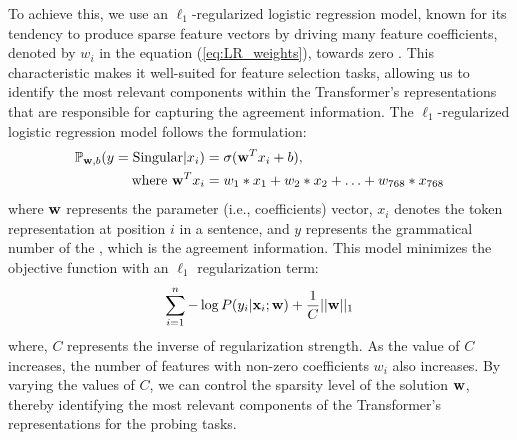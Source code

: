 To achieve this, we use an $\ell_1$-regularized logistic regression model,
known for its tendency to produce sparse feature vectors by driving many feature coefficients, denoted by $w_i$ in the equation (\ref{eq:LR_weights}), towards zero \citep{tibshirani96regression,ng2004feature}. This characteristic makes it well-suited for feature selection tasks, allowing us to identify the most relevant components within the Transformer's representations that are responsible for capturing the agreement information.
The $\ell_1$-regularized logistic regression model follows the formulation:
\begin{equation}
\begin{aligned}
\mathbb{P}_{{\mathbf w},b}(y=\text{Singular}|x_i) &= \sigma({\mathbf w}^T x_i + b),  \\
\text{where } {\mathbf w}^T x_i &= w_1*x_1 + w_2*x_2 + \ldots + w_{768}*x_{768}
\end{aligned}
\label{eq:LR_weights}
\end{equation}
where ${\mathbf w}$ represents the parameter (i.e., coefficients) vector, $x_i$ denotes the token representation at position $i$ in a sentence, and $y$ represents the grammatical number of the \cue, which is the agreement information. This model minimizes the objective function with an $\ell_1$ regularization term:
\begin{equation}
    \sum_{i=1}^n -\log P(y_i | {\mathbf x}_i;{\mathbf w}) + \frac{1}{C}||{\mathbf w}||_1
\end{equation}
where, $C$ represents the inverse of regularization strength. As the value of $C$ increases, the number of features with non-zero coefficients $w_i$ also increases. By varying the values of $C$, we can control the sparsity level of the solution ${\mathbf w}$, thereby identifying the most relevant components of the Transformer's representations for the probing tasks. 

